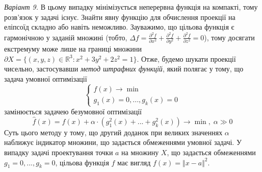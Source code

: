 \documentclass{extreport}
\begin{document}
\emph{Варіант 9.} В цьому випадку мінімізується неперервна функція на компакті, тому розв'язок у задачі існує. Знайти явну функцію для обчислення проекції
на еліпсоїд складно або навіть неможливо.
Зауважимо, що цільова функція є гармонічною у заданій множині 
(тобто, $\Delta f = \frac{\partial^2 f}{\partial x^2} + \frac{\partial^2 f}{\partial y^2} + \frac{\partial^2 f}{\partial z^2} = 0$),
тому досягати екстремуму може лише на границі множини $\partial X = \{ (x,y,z) \in \mathbb{R}^3 : x^2 + 3y^2 + 2z^2 = 1 \}$. 
Отже, будемо шукати проекції чисельно, застосувавши \emph{метод штрафних функцій}, який полягає у тому, що задача умовної оптимізації
$$ 
\begin{cases}
    f(x) \to \min \\
    g_1(x) = 0, ..., g_k(x) = 0
\end{cases}
$$
замінюється задачею безумовної оптимізації
$$
\widehat{f}(x) = f(x) + \alpha \cdot \left(g_1^2(x) + ... + g_k^2(x)\right) \to \min, \; \alpha \gg 0
$$
Суть цього методу у тому, що другий доданок при великих значеннях $\alpha$ наближує індикатор множини, що задається обмеженнями умовної задачі.
У випадку задачі проектування точки $a$ на множину $X$, що задається обмеженнями $g_1 = 0, ..., g_k = 0$, цільова функція $f$ має вигляд
$f(x) = \Vert x - a \Vert^2$.
\end{document}
